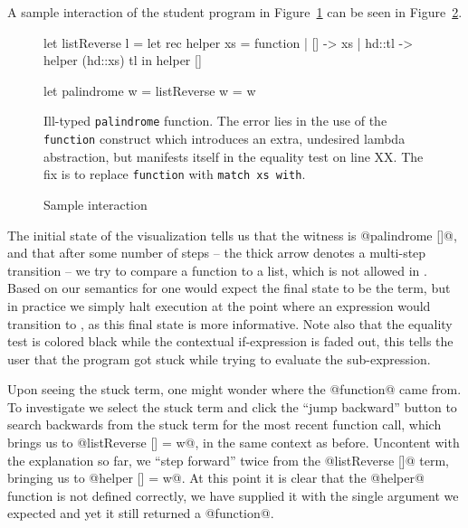 A sample interaction of the student program in
Figure~\ref{fig:palindrome} can be seen in
Figure~\ref{fig:nanomaly-palindrome}.
%
\begin{figure}[ht]
\centering
\begin{code}
  let listReverse l =
    let rec helper xs = function
      | []     -> xs
      | hd::tl -> helper (hd::xs) tl
    in helper []

  let palindrome w =
    listReverse w = w
\end{code}
\caption{Ill-typed \texttt{palindrome} function. The error lies in the
  use of the \texttt{function} construct which introduces an extra,
  undesired lambda abstraction, but manifests itself in the equality
  test on line XX. The fix is to replace \texttt{function} with
  \texttt{match xs with}. }
\label{fig:palindrome}
\end{figure}
%
\begin{figure}[ht]
\caption{Sample interaction}
\label{fig:nanomaly-palindrome}
\end{figure}
%
The initial state of the visualization tells us that the witness is
@palindrome []@, and that after some number of steps -- the thick arrow
denotes a multi-step transition -- we try to compare a function to a
list, which is not allowed in \ocaml.
%
Based on our semantics for \lang one would expect the final state to be
the \stuck term, but in practice we simply halt execution at the point
where an expression would transition to \stuck, as this final state is
more informative.
%
Note also that the equality test is colored black while the contextual
if-expression is faded out, this tells the user that the program got
stuck while trying to evaluate the sub-expression.

Upon seeing the stuck term, one might wonder where the @function@
came from.
%
To investigate we select the stuck term and click the ``jump backward''
button to search backwards from the stuck term for the most recent
function call, which brings us to @listReverse [] = w@, in the same
context as before.
%
Uncontent with the explanation so far, we ``step forward'' twice from
the @listReverse []@ term, bringing us to @helper [] = w@.
%
At this point it is clear that the @helper@ function is not defined
correctly, we have supplied it with the single argument we expected and
yet it still returned a @function@.

